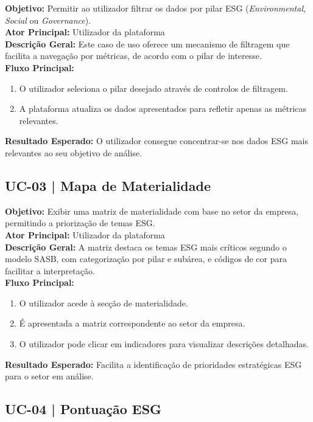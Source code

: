 \textbf{Objetivo:} Permitir ao utilizador filtrar os dados por pilar ESG (\textit{Environmental}, \textit{Social} ou \textit{Governance}).\\
\textbf{Ator Principal:} Utilizador da plataforma\\
\textbf{Descrição Geral:} Este caso de uso oferece um mecanismo de filtragem que facilita a navegação por métricas, de acordo com o pilar de interesse.\\
\textbf{Fluxo Principal:}
\begin{enumerate}
    \item O utilizador seleciona o pilar desejado através de controlos de filtragem.
    \item A plataforma atualiza os dados apresentados para refletir apenas as métricas relevantes.
\end{enumerate}
\textbf{Resultado Esperado:} O utilizador consegue concentrar-se nos dados ESG mais relevantes ao seu objetivo de análise.

\subsection{UC-03 | Mapa de Materialidade}

\textbf{Objetivo:} Exibir uma matriz de materialidade com base no setor da empresa, permitindo a priorização de temas ESG.\\
\textbf{Ator Principal:} Utilizador da plataforma\\
\textbf{Descrição Geral:} A matriz destaca os temas ESG mais críticos segundo o modelo SASB, com categorização por pilar e subárea, e códigos de cor para facilitar a interpretação.\\
\textbf{Fluxo Principal:}
\begin{enumerate}
    \item O utilizador acede à secção de materialidade.
    \item É apresentada a matriz correspondente ao setor da empresa.
    \item O utilizador pode clicar em indicadores para visualizar descrições detalhadas.
\end{enumerate}
\textbf{Resultado Esperado:} Facilita a identificação de prioridades estratégicas ESG para o setor em análise.

\subsection{UC-04 | Pontuação ESG}

